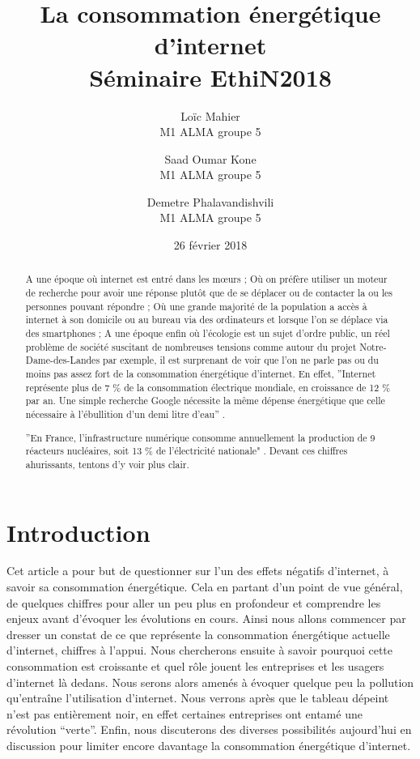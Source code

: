 \documentclass[a4paper,twocolumn,12pt]{article}
\title{\Huge \bfseries La consommation énergétique d'internet \\ \vspace{0.2cm}  \normalsize Séminaire EthiN2018}
\author{Loïc Mahier \\ \small{M1 ALMA groupe 5} \and Saad Oumar Kone \\ \small{M1 ALMA groupe 5} \and Demetre Phalavandishvili \\ \small{M1 ALMA groupe 5}}
\date{\small{26 février 2018}}
\begin{document}
\maketitle 

\begin{abstract}

	A une époque où internet est entré dans les mœurs ; Où on préfère utiliser un moteur de recherche pour avoir une réponse plutôt que de se déplacer ou de contacter la ou les personnes pouvant répondre ; Où une grande majorité de la population a accès à internet à son domicile ou au bureau via des ordinateurs et lorsque l'on se déplace via des smartphones ; A une époque enfin où l'écologie est un sujet d'ordre public, un réel problème de société suscitant de nombreuses tensions comme autour du projet Notre-Dame-des-Landes par exemple, il est surprenant de voir que l'on ne parle pas ou du moins pas assez fort de la consommation énergétique d'internet. En effet, ''Internet représente plus de 7 \% de la consommation électrique mondiale, en croissance de 12 \% par an. Une simple recherche Google nécessite la même dépense énergétique que celle nécessaire à l’ébullition d’un demi litre d’eau'' \cite{1}.

\newpage

	''En France, l’infrastructure numérique consomme annuellement la production de 9 réacteurs nucléaires, soit 13 \% de l’électricité nationale" \cite{1}. Devant ces chiffres ahurissants, tentons d'y voir plus clair.

\end{abstract}

\tableofcontents

\newpage

\section{Introduction}

	Cet article a pour but de questionner sur l’un des effets négatifs d’internet, à savoir sa consommation énergétique. Cela en partant d’un point de vue général, de quelques chiffres pour aller un peu plus en profondeur et comprendre les enjeux avant d’évoquer les évolutions en cours. Ainsi nous allons commencer par dresser un constat de ce que représente la consommation énergétique actuelle d’internet, chiffres à l’appui. Nous chercherons ensuite à savoir pourquoi cette consommation est croissante et quel rôle jouent les entreprises et les usagers d’internet là dedans. Nous serons alors amenés à évoquer quelque peu la pollution qu’entraîne l’utilisation d’internet. Nous verrons après que le tableau dépeint n’est pas entièrement noir, en effet certaines entreprises ont entamé une révolution “verte”. Enfin, nous discuterons des diverses possibilités aujourd’hui en discussion pour limiter encore davantage la consommation énergétique d’internet.  \\
	
\end{document}
